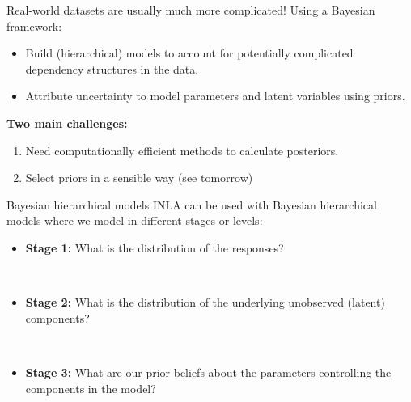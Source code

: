 \documentclass[
  ignorenonframetext,
]{beamer}
\providecommand{\tightlist}{%
  \setlength{\itemsep}{0pt}\setlength{\parskip}{0pt}}
\begin{document}
\begin{frame}{Real-world datasets are usually much more complicated!}
\protect\hypertarget{real-world-datasets-are-usually-much-more-complicated}{}
Using a Bayesian framework:

\begin{itemize}
\tightlist
\item
  Build (hierarchical) models to account for potentially complicated
  dependency structures in the data.
\item
  Attribute uncertainty to model parameters and latent variables using
  priors.
\end{itemize}

\textbf{Two main challenges:}

\begin{enumerate}
\tightlist
\item
  Need computationally efficient methods to calculate posteriors.
\item
  Select priors in a sensible way (see tomorrow)
\end{enumerate}
\end{frame}

\begin{frame}{Bayesian hierarchical models}
\protect\hypertarget{bayesian-hierarchical-models-1}{}
INLA can be used with Bayesian hierarchical models where we model in
different stages or levels:

\begin{itemize}
\tightlist
\item
  \textbf{Stage 1:} What is the distribution of the responses?\\
  \strut \\
\item
  \textbf{Stage 2:} What is the distribution of the underlying
  unobserved (latent) components?\\
  \strut \\
\item
  \textbf{Stage 3:} What are our prior beliefs about the parameters
  controlling the components in the model?
\end{itemize}
\end{frame}
\end{document}
